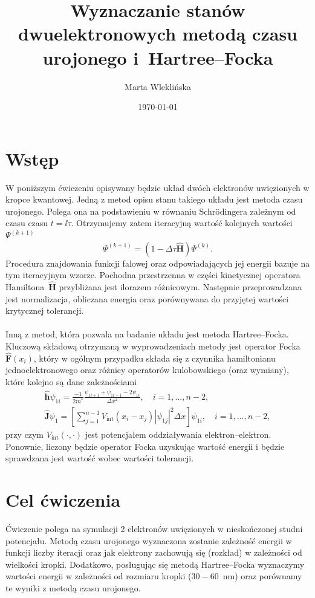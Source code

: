\documentclass{article}
\title{Wyznaczanie stanów dwuelektronowych metodą czasu urojonego i~Hartree--Focka}
\author{Marta Wleklińska}
\date{\today}
\begin{document}
\maketitle

\section{Wstęp}
W poniższym ćwiczeniu opisywany będzie układ dwóch elektronów uwięzionych w kropce kwantowej.
Jedną z metod opisu stanu takiego układu jest metoda czasu urojonego.
Polega ona na podstawieniu w równaniu Schr{\"o}dingera zależnym od czasu czasu $t = \ii \tau$.
Otrzymujemy zatem iteracyjną wartość kolejnych wartości $\Psi^{(k+1)}$
\begin{equation}
    \Psi^{(k+1)} = \left(1 - \Delta \tau \mathbf{\hat{H}}\right)\Psi^{(k)}.
\end{equation}
Procedura znajdowania funkcji falowej oraz odpowiadających jej energii bazuje na tym iteracyjnym wzorze.
Pochodna przestrzenna w części kinetycznej operatora Hamiltona~$\mathbf{\hat{H}}$ przybliżana jest ilorazem różnicowym.
Następnie przeprowadzana jest normalizacja, obliczana energia oraz porównywana do przyjętej wartości krytycznej tolerancji.\\
\\
Inną z metod, która pozwala na badanie układu jest metoda Hartree--Focka.
Kluczową składową otrzymaną w wyprowadzeniach metody jest operator Focka $\mathbf{\hat{F}}(x_i)$, który w ogólnym przypadku składa się z czynnika hamiltonianu jednoelektronowego oraz różnicy operatorów kulobowskiego (oraz wymiany), które kolejno są dane zależnościami
\begin{gather}
    \mathbf{\hat{h}} \psi_{1i} = \frac{-1}{2m^*}\frac{\psi_{1i+1} + \psi_{1i-1}-2\psi_{1i}}{\Delta x^2}, \quad i = 1, ..., n-2,\\
    \mathbf{\hat{J}}\psi_{1} = \left[\sum_{j=1}^{n-1}V_{\text{int}}\left(x_i - x_j\right)|\psi_{1j}|^2\Delta x\right]\psi_{1i}, \quad i = 1, ..., n-2,
\end{gather}
przy czym $V_{\text{int}}(\cdot, \cdot)$ jest potencjałem oddziaływania elektron--elektron.
Ponownie, liczony będzie operator Focka uzyskując wartość energii i będzie sprawdzana jest wartość wobec wartości tolerancji.
\section{Cel ćwiczenia}
Ćwiczenie polega na symulacji 2 elektronów uwięzionych w nieskończonej studni potencjału.
Metodą czasu urojonego wyznaczona zostanie zależność energii w funkcji liczby iteracji oraz jak elektrony zachowują się (rozkład) w zależności od wielkości kropki.
Dodatkowo, posługując się metodą Hartree--Focka wyznaczymy wartości energii w zależności od rozmiaru kropki ($30-60$~nm) oraz porównamy te wyniki z metodą czasu urojonego.
\end{document}
